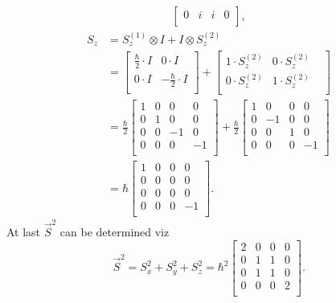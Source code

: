 \begin{example}
\begin{enumerate}
\begin{equation}
\begin{split}
\begin{bmatrix}
					0 & i & i & 0 \\
				\end{bmatrix},
			\end{split}
		\end{equation}
		\begin{equation}
			\begin{split}
				S_z&=S^{(1)}_z \otimes I +I\otimes S^{(2)}_z\\
				&=\begin{bmatrix}
					\frac{\hbar}{2}\cdot I & 0\cdot I \\
					0\cdot I & -\frac{\hbar}{2}\cdot I\\
				\end{bmatrix}+\begin{bmatrix}
					1\cdot S^{(2)}_z & 0\cdot S^{(2)}_z & \\
					0\cdot S^{(2)}_z & 1\cdot S^{(2)}_z\\
				\end{bmatrix}\\
				&=\frac{\hbar}{2}\begin{bmatrix}
					1 & 0 & 0 & 0 \\
					0 & 1 & 0 & 0 \\
					0 & 0 & -1 & 0 \\
					0 & 0 & 0 & -1 \\
				\end{bmatrix}+\frac{\hbar}{2}\begin{bmatrix}
					1 & 0 & 0 & 0 \\
					0 & -1 & 0 & 0 \\
					0 & 0 & 1 & 0 \\
					0 & 0 & 0 & -1 \\
				\end{bmatrix}\\
				&=\hbar\begin{bmatrix}
					1 & 0 & 0 & 0 \\
					0 & 0 & 0 & 0 \\
					0 & 0 & 0 & 0 \\
					0 & 0 & 0 & -1 \\
				\end{bmatrix}.
			\end{split}
		\end{equation} 
		At last $\vec{S}^2$ can be determined viz
		\begin{equation}
			\vec{S}^2=S_x^2+S_y^2+S_z^2=\hbar^2\begin{bmatrix}
				2 & 0 & 0 & 0 \\
				0 & 1 & 1 & 0 \\
				0 & 1 & 1 & 0 \\
				0 & 0 & 0 & 2 \\
			\end{bmatrix}.
		\end{equation} 
		

\end{enumerate}
\end{example}
